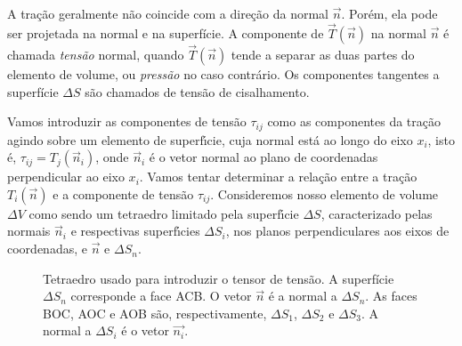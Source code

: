 A tra\c{c}\~ao geralmente n\~ao coincide com a dire\c{c}\~ao da
normal $\vec{n}$. Por\'em, ela pode ser projetada na normal e
na superf\'icie. A componente de $\vec{T}(\vec{n})$ na normal
$\vec{n}$ \'e chamada {\it tens\~ao} normal, quando $\vec{T}(\vec{n})$
tende a separar as duas partes do elemento de volume, ou {\it
press\~ao} no caso contr\'ario. Os componentes tangentes
a superf\'icie $\Delta S$ s\~ao chamados de tens\~ao de cisalhamento.



Vamos introduzir as componentes de tens\~ao $\tau_{ij}$ como as
componentes da tra\c{c}\~ao agindo sobre um elemento de
superf\'{\i}cie, cuja normal est\'a ao longo do eixo $x_i$, isto
\'e, $\tau_{ij}=T_j(\vec{n}_i)$, onde $\vec{n}_i$ \'e o vetor normal ao
plano de coordenadas perpendicular ao eixo $x_i$. Vamos tentar determinar a
rela\c{c}\~ao entre a tra\c{c}\~ao $T_i(\vec{n})$ e a componente
de tens\~ao $\tau_{ij}$. Consideremos nosso elemento de volume
$\Delta V$ como sendo um tetraedro limitado pela superf\'{\i}cie
$\Delta S$, caracterizado pelas normais $\vec{n}_i$ e respectivas
superf\'{\i}cies $\Delta S_i$, nos planos perpendiculares aos
eixos de coordenadas, e $\vec{n}$ e $\Delta S_n$. 
\begin{figure}[!h]
\centering
{}
\caption{Tetraedro usado para introduzir o tensor de tens\~ao. A superf\'icie $\Delta S_n$ corresponde a face ACB. O vetor $\vec{n}$ \'e a normal a $\Delta S_n$. As faces BOC, AOC e AOB s\~ao, respectivamente,  $\Delta S_1$, $\Delta S_2$ e $\Delta S_3$. A normal a $\Delta S_i$ \'e o vetor $\vec{n_i}$.}
\label{fig:tensor-tensao}
\end{figure}
